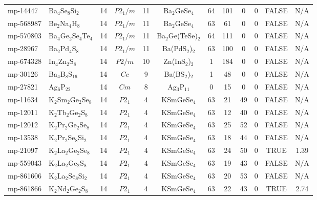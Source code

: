 {\begin{longtable}{llcccccccccc}
    mp-14447 & Ba$_{4}$Se$_{8}$Si$_{2}$ & 14    & $P2_1/m$ & 11    & Ba$_{2}$GeSe$_{4}$ & 64    & 101   & 0     & 0     & FALSE & N/A \\
    mp-568987 & Be$_{2}$Na$_{4}$H$_{8}$ & 14    & $P2_1/m$ & 11    & Ba$_{2}$GeSe$_{4}$ & 63    & 61    & 0     & 0     & FALSE & N/A \\
    mp-570803 & Ba$_{4}$Ge$_{2}$Se$_{4}$Te$_{4}$ & 14    & $P2_1/m$ & 11    & Ba$_{2}$Ge(TeSe)$_{2}$ & 64    & 111   & 0     & 0     & FALSE & N/A \\
    mp-28967 & Ba$_{2}$Pd$_{4}$S$_{8}$ & 14    & $P2_1/m$ & 11    & Ba(PdS$_{2}$)$_{2}$ & 63    & 100   & 0     & 0     & FALSE & N/A \\
    mp-674328 & In$_{4}$Zn$_{2}$S$_{8}$ & 14    & $P2/m$ & 10    & Zn(InS$_{2}$)$_{2}$ & 1     & 184   & 0     & 0     & FALSE & N/A \\
    mp-30126 & Ba$_{4}$B$_{8}$S$_{16}$ & 14    & $Cc$  & 9     & Ba(BS$_{2}$)$_{2}$ & 1     & 48    & 0     & 0     & FALSE & N/A \\
    mp-27821 & Ag$_{6}$P$_{22}$ & 14    & $Cm$  & 8     & Ag$_{3}$P$_{11}$ & 0     & 15    & 0     & 0     & FALSE & N/A \\
    mp-11634 & K$_{2}$Sm$_{2}$Ge$_{2}$Se$_{8}$ & 14    & $P2_1$ & 4     & KSmGeSe$_{4}$ & 63    & 21    & 49    & 0     & FALSE & N/A \\
    mp-12011 & K$_{2}$Tb$_{2}$Ge$_{2}$S$_{8}$ & 14    & $P2_1$ & 4     & KSmGeSe$_{4}$ & 63    & 12    & 40    & 0     & FALSE & N/A \\
    mp-12012 & K$_{2}$Pr$_{2}$Ge$_{2}$Se$_{8}$ & 14    & $P2_1$ & 4     & KSmGeSe$_{4}$ & 63    & 25    & 52    & 0     & FALSE & N/A \\
    mp-13538 & K$_{2}$Pr$_{2}$Se$_{8}$Si$_{2}$ & 14    & $P2_1$ & 4     & KSmGeSe$_{4}$ & 63    & 18    & 44    & 0     & FALSE & N/A \\
    mp-21097 & K$_{2}$La$_{2}$Ge$_{2}$Se$_{8}$ & 14    & $P2_1$ & 4     & KSmGeSe$_{4}$ & 63    & 24    & 50    & 0     & TRUE  & 1.39  \\
    mp-559043 & K$_{2}$La$_{2}$Ge$_{2}$S$_{8}$ & 14    & $P2_1$ & 4     & KSmGeSe$_{4}$ & 63    & 19    & 43    & 0     & FALSE & N/A \\
    mp-861606 & K$_{2}$La$_{2}$Se$_{8}$Si$_{2}$ & 14    & $P2_1$ & 4     & KSmGeSe$_{4}$ & 63    & 20    & 53    & 0     & FALSE & N/A \\
    mp-861866 & K$_{2}$Nd$_{2}$Ge$_{2}$S$_{8}$ & 14    & $P2_1$ & 4     & KSmGeSe$_{4}$ & 63    & 22    & 43    & 0     & TRUE  & 2.74  \\

\end{longtable}}

